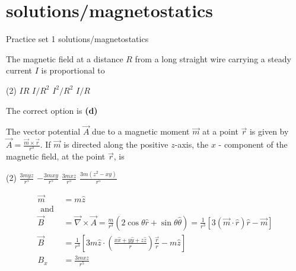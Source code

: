\chapter{solutions/magnetostatics}
\begin{abox}
	Practice set 1 solutions/magnetostatics
	\end{abox}
\begin{enumerate}
\begin{minipage}{\textwidth}
	\item The magnetic field at a distance $R$ from a long straight wire carrying a steady current $I$ is proportional to
\end{minipage}
\begin{tasks}(2)
	\task[\textbf{A.}] $I R$
	\task[\textbf{B.}] $I / R^{2}$
	\task[\textbf{C.}]$I^{2} / R^{2}$
	\task[\textbf{D.}]$I / R$
\end{tasks}
\begin{answer}
	The correct option is \textbf{(d)}	
\end{answer}
\begin{minipage}{\textwidth}
	\item The vector potential $\vec{A}$ due to a magnetic moment $\vec{m}$ at a point $\vec{r}$ is given by $\vec{A}=\frac{\vec{m} \times \vec{r}}{r^{3}}$.
	If $\vec{m}$ is directed along the positive $z$-axis, the $x$ - component of the magnetic field, at the point $\vec{r}$, is
\end{minipage}
\begin{tasks}(2)
	\task[\textbf{A.}] $\frac{3 m y z}{r^{5}}$
	\task[\textbf{B.}] $-\frac{3 m x y}{r^{5}}$
	\task[\textbf{C.}]$\frac{3 m x z}{r^{5}}$
	\task[\textbf{D.}]$\frac{3 m\left(z^{2}-x y\right)}{r^{5}}$
\end{tasks}
\begin{answer}
	\begin{align*}
	\vec{m}&=m \hat{z}\\
	 \text { and }\\
	 \vec{B}&=\vec{\nabla} \times \vec{A}=\frac{m}{r^{3}}(2 \cos \theta \hat{r}+\sin \theta \hat{\theta})=\frac{1}{r^{3}}[3(\vec{m} \cdot \hat{r}) \hat{r}-\vec{m}] \\
 \vec{B}&=\frac{1}{r^{3}}\left[3 m \hat{z} \cdot\left(\frac{x \hat{x}+y \hat{y}+z \hat{z}}{r}\right) \frac{\vec{r}}{r}-m \hat{z}\right] \\
   B_{x}&=\frac{3 m x z}{r^{5}}
	\end{align*}
\end{answer}
\begin{minipage}{\textwidth}

\end{minipage}
\end{enumerate}
